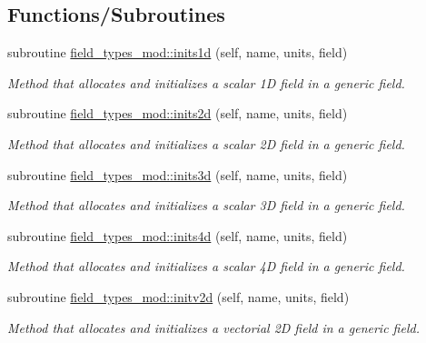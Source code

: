 \subsection*{Functions/\+Subroutines}
\begin{DoxyCompactItemize}
\item 
subroutine \mbox{\hyperlink{namespacefield__types__mod_ae4985a4f37aad76b5bd9d4fdbdec8ff3}{field\+\_\+types\+\_\+mod\+::inits1d}} (self, name, units, field)
\begin{DoxyCompactList}\small\item\em Method that allocates and initializes a scalar 1D field in a generic field. \end{DoxyCompactList}\item 
subroutine \mbox{\hyperlink{namespacefield__types__mod_a55a57c6fa8c785a5f529ca577a677845}{field\+\_\+types\+\_\+mod\+::inits2d}} (self, name, units, field)
\begin{DoxyCompactList}\small\item\em Method that allocates and initializes a scalar 2D field in a generic field. \end{DoxyCompactList}\item 
subroutine \mbox{\hyperlink{namespacefield__types__mod_ac3c3c9514102272c69299be06deabbcd}{field\+\_\+types\+\_\+mod\+::inits3d}} (self, name, units, field)
\begin{DoxyCompactList}\small\item\em Method that allocates and initializes a scalar 3D field in a generic field. \end{DoxyCompactList}\item 
subroutine \mbox{\hyperlink{namespacefield__types__mod_a0499b29bbd4e4628fe73678cf554d918}{field\+\_\+types\+\_\+mod\+::inits4d}} (self, name, units, field)
\begin{DoxyCompactList}\small\item\em Method that allocates and initializes a scalar 4D field in a generic field. \end{DoxyCompactList}\item 
subroutine \mbox{\hyperlink{namespacefield__types__mod_a26cb1df2a85bf21d45693942957c9dae}{field\+\_\+types\+\_\+mod\+::initv2d}} (self, name, units, field)
\begin{DoxyCompactList}\small\item\em Method that allocates and initializes a vectorial 2D field in a generic field. \end{DoxyCompactList}\item 

\end{DoxyCompactItemize}
